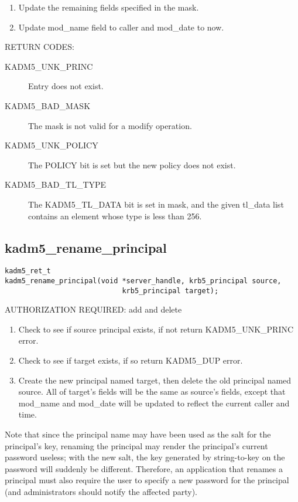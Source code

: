 \begin{enumerate}
\item Update the remaining fields specified in the mask.
\item Update mod_name field to caller and mod_date to now.
\end{enumerate}

RETURN CODES:

\begin{description}
\item[KADM5_UNK_PRINC] Entry does not exist.
\item[KADM5_BAD_MASK] The mask is not valid for a modify
operation.
\item[KADM5_UNK_POLICY] The POLICY bit is set but the new
policy does not exist.
\item[KADM5_BAD_TL_TYPE] The KADM5_TL_DATA bit is set in mask, and the
given tl_data list contains an element whose type is less than 256.
\end{description}

\subsection{kadm5_rename_principal}

\begin{verbatim}
kadm5_ret_t
kadm5_rename_principal(void *server_handle, krb5_principal source,
                            krb5_principal target);
\end{verbatim}

AUTHORIZATION REQUIRED: add and delete

\begin{enumerate}
\item Check to see if source principal exists, if not return
KADM5_UNK_PRINC error. 
\item Check to see if target exists, if so return KADM5_DUP error.
\item Create the new principal named target, then delete the old
principal named source.  All of target's fields will be the same as
source's fields, except that mod_name and mod_date will be updated to
reflect the current caller and time.
\end{enumerate}

Note that since the principal name may have been used as the salt for
the principal's key, renaming the principal may render the principal's
current password useless; with the new salt, the key generated by
string-to-key on the password will suddenly be different.  Therefore,
an application that renames a principal must also require the user to
specify a new password for the principal (and administrators should
notify the affected party).

